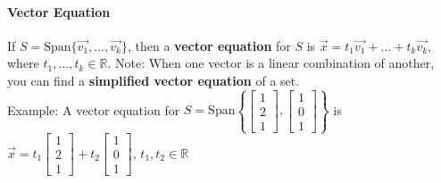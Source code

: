 \documentclass[10pt,letter]{article}
\begin{document}
\paragraph{Vector Equation} If $S=\text{Span}\{\vec{v_1},\ldots,\vec{v_k}\}$, then a \textbf{vector equation} for $S$ is $\vec{x}=t_1\vec{v_1}+\ldots+t_k\vec{v_k}$, where $t_1,\ldots,t_k\in\mathbb{R}$. Note: When one vector is a linear combination of another, you can find a \textbf{simplified vector equation} of a set. \\ 
Example: A vector equation for $S=\text{Span}\left\{\begin{bmatrix}1\\2\\1\end{bmatrix}, \begin{bmatrix}1\\0\\1\end{bmatrix}\right\}$ is $\vec{x}=t_1\begin{bmatrix}1\\2\\1\end{bmatrix} + t_2\begin{bmatrix}1\\0\\1\end{bmatrix}$, $t_1,t_2\in\mathbb{R}$
\end{document}
